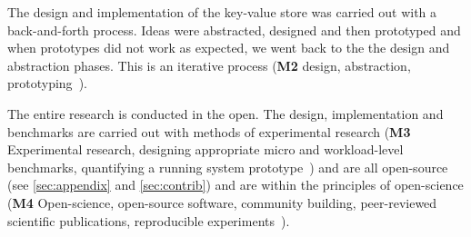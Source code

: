 The design and implementation of the key-value store was carried out with a back-and-forth process. Ideas were abstracted, designed and then prototyped and when prototypes did not work as expected, we went back to the the design and abstraction phases. This is an iterative process (\textbf{M2} design, abstraction, prototyping~\cite{iosup2019atlarge, hamming1997art, peffers2007design}).

The entire research is conducted in the open. The design, implementation and benchmarks are carried out with methods of experimental research (\textbf{M3} Experimental research, designing appropriate micro and workload-level benchmarks, quantifying a running system prototype~\cite{jain2008art,gernor2202crimes, ousterhout2018always}) and are all open-source (see \autoref{sec:appendix} and \autoref{sec:contrib}) and are within the principles of open-science (\textbf{M4} Open-science, open-source software, community building, peer-reviewed scientific publications, reproducible experiments~\cite{bezjak2018openscience, wilkinson2016fair,berger2019crisis,uta2020big}). 

